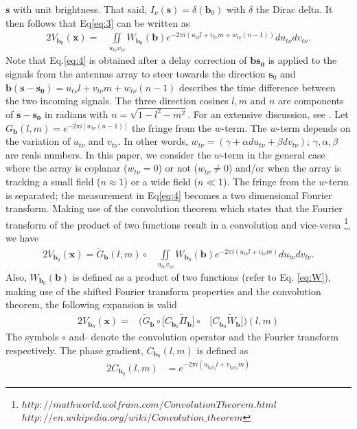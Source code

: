 $\mathbf{s}$ with unit brightness. That said, $I_{\nu}(\mathbf{s})=\delta(\mathbf{b}_0)$ with $\delta$ the Dirac delta. 
It then follows that Eq\ref{eq:3} can be written as
\begin{alignat}{2}
V_{\mathbf{b}_0}(\mathbf{x})  =&\iint\limits_{u_{t\nu}v_{t\nu}}W_{\mathbf{b}_0}(\mathbf{b}) e^{-2\pi i (u_{t\nu}l+v_{t\nu}m+w_{t\nu}(n-1))}du_{t\nu}dv_{t\nu}. \label{eq:4}
\end{alignat} 
Note that Eq.\ref{eq:4} is obtained after a
delay correction of $\mathbf{b}\mathbf{s_0}$ is  applied to the signals from the antennas 
array to steer towards the direction $\mathbf{s}_0$ and $\mathbf{b}(\mathbf{s}-\mathbf{s_0})=u_{t\nu}l + v_{t\nu}m+w_{t\nu}(n-1)$ 
describes  the time difference between the two incoming signals. The three direction cosines $l,m$ and $n$ are components
of  $\mathbf{s}-\mathbf{s_0}$  in radians with $n=\sqrt{1-l^2-m^2}$.
For an extensive discussion, see \citep{thompson2008interferometry,taylor1999synthesis,leshem2000radio}.
Let  $G_{\mathbf{b}}(l,m)=e^{-2\pi i[w_{t\nu}(n-1)]}$ the fringe from the $w$-term. The $w$-term depends on the variation of
$u_{t\nu}$ and $v_{t\nu}$. In other words, $w_{t\nu}=(\gamma + \alpha  du_{t\nu} + \beta dv_{t\nu})$; $\gamma, \alpha,\beta$ are reals numbers.
In this paper, we consider the $w$-term in 
the general case where the array is coplanar ($w_{t\nu}=0$) or not ($w_{t\nu}\neq 0$) and/or when the array is
tracking a small field ($n \approx 1$) or a wide field ($n \ll 1$). The fringe from the $w$-term is separated; 
the measurement in Eq\ref{eq:4} becomes  a two dimensional 
Fourier transform. Making use of the convolution theorem which  
states that the Fourier transform of the product of two functions result in a convolution and vice-versa
\footnote{$http://mathworld.wolfram.com/ConvolutionTheorem.html$ $http://en.wikipedia.org/wiki/Convolution\_theorem$}, 
we have
\begin{alignat}{2}
V_{\mathbf{b}_0}(\mathbf{x})  =\widetilde{G}_{\mathbf{b}}(l,m)\circ &\iint\limits_{u_{t\nu}v_{t\nu}}W_{\mathbf{b}_0}(\mathbf{b}) e^{-2\pi i (u_{t\nu}l+v_{t\nu}m)}du_{t\nu}dv_{t\nu}. \label{eq:5}
\end{alignat} 
Also, $W_{\mathbf{b}_0}(\mathbf{b})$ is defined as a product of two functions (refer to Eq. \ref{eq:W}), making use
of the shifted Fourier transform properties and the convolution theorem, the following expansion is valid
\begin{alignat}{2}
V_{\mathbf{b}_0}(\mathbf{x}) =&\Bigg(\widetilde{G}_{\mathbf{b}}\circ\Big[C_{\mathbf{b}_0}\widetilde{\Pi}_{\mathbf{b}}\Big]
		    \circ &\Big[C_{\mathbf{b}_0}\widetilde{W}_{\mathbf{b}}\Big]\Bigg)(l,m)  \label{eq:6}
\end{alignat}
The symbols $\circ$ and  $\widetilde{}$ denote the convolution operator and the Fourier transform respectively.  The phase gradient, 
$C_{\mathbf{b}_0}(l,m)$  is defined as
\begin{alignat}{2}
C_{\mathbf{b}_0}(l,m) &=e^{-2\pi i (u_{t_0\nu_0}l+v_{t_0\nu_0}m)}
\end{alignat}
